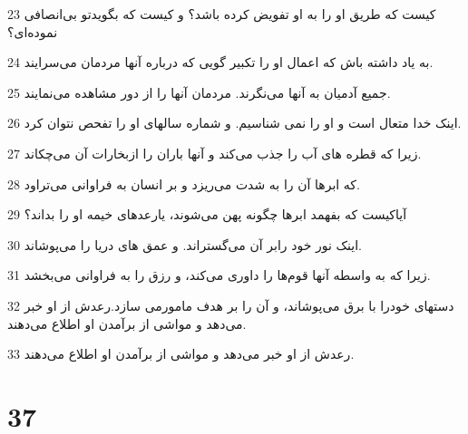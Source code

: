 \par 23 کیست که طریق او را به او تفویض کرده باشد؟ و کیست که بگویدتو بی‌انصافی نموده‌ای؟
\par 24 به یاد داشته باش که اعمال او را تکبیر گویی که درباره آنها مردمان می‌سرایند.
\par 25 جمیع آدمیان به آنها می‌نگرند. مردمان آنها را از دور مشاهده می‌نمایند.
\par 26 اینک خدا متعال است و او را نمی شناسیم. و شماره سالهای او را تفحص نتوان کرد.
\par 27 زیرا که قطره های آب را جذب می‌کند و آنها باران را ازبخارات آن می‌چکاند.
\par 28 که ابرها آن را به شدت می‌ریزد و بر انسان به فراوانی می‌تراود.
\par 29 آیاکیست که بفهمد ابرها چگونه پهن می‌شوند، یارعدهای خیمه او را بداند؟
\par 30 اینک نور خود رابر آن می‌گستراند. و عمق های دریا را می‌پوشاند.
\par 31 زیرا که به واسطه آنها قوم‌ها را داوری می‌کند، و رزق را به فراوانی می‌بخشد.
\par 32 دستهای خودرا با برق می‌پوشاند، و آن را بر هدف مامورمی سازد.رعدش از او خبر می‌دهد و مواشی از برآمدن او اطلاع می‌دهند.
\par 33 رعدش از او خبر می‌دهد و مواشی از برآمدن او اطلاع می‌دهند.
 
\chapter{37}

